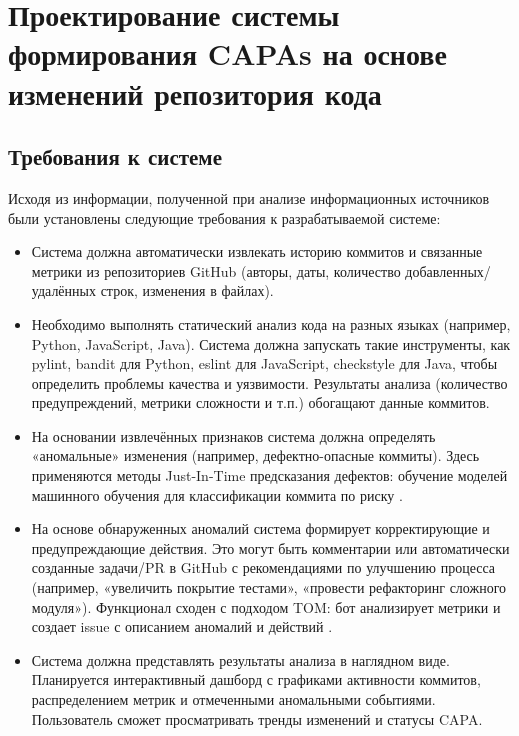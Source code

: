 \chapter{Проектирование системы формирования CAPAs на основе изменений репозитория кода} \label{ch2}

\section{Требования к системе} \label{ch2:method_selection}

Исходя из информации, полученной при анализе информационных источников были установлены следующие требования к разрабатываемой системе:

\begin{itemize}
	\item Система должна автоматически извлекать историю коммитов и связанные метрики из репозиториев GitHub (авторы, даты, количество добавленных/удалённых строк, изменения в файлах).
	\item Необходимо выполнять статический анализ кода на разных языках (например, Python, JavaScript, Java). Система должна запускать такие инструменты, как pylint, bandit для Python, eslint для JavaScript, checkstyle для Java, чтобы определить проблемы качества и уязвимости. Результаты анализа (количество предупреждений, метрики сложности и т.п.) обогащают данные коммитов.
	\item  На основании извлечённых признаков система должна определять «аномальные» изменения (например, дефектно-опасные коммиты). Здесь применяются методы Just-In-Time предсказания дефектов: обучение моделей машинного обучения для классификации коммита по риску \cite{Hericko}.
	\item На основе обнаруженных аномалий система формирует корректирующие и предупреждающие действия. Это могут быть комментарии или автоматически созданные задачи/PR в GitHub с рекомендациями по улучшению процесса (например, «увеличить покрытие тестами», «провести рефакторинг сложного модуля»). Функционал сходен с подходом TOM: бот анализирует метрики и создает issue с описанием аномалий и действий \cite{Bugayenko2022}.
	\item Система должна представлять результаты анализа в наглядном виде. Планируется интерактивный дашборд с графиками активности коммитов, распределением метрик и отмеченными аномальными событиями. Пользователь сможет просматривать тренды изменений и статусы CAPA.
\end{itemize}

